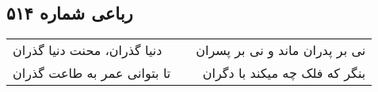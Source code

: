 \begin{center}
\section*{رباعی شماره ۵۱۴}
\label{sec:sh514}
\begin{longtable}{l p{0.5cm} r}
دنیا گذران، محنت دنیا گذران
&&
نی بر پدران ماند و نی بر پسران
\\
تا بتوانی عمر به طاعت گذران
&&
بنگر که فلک چه میکند با دگران
\\
\end{longtable}
\end{center}
